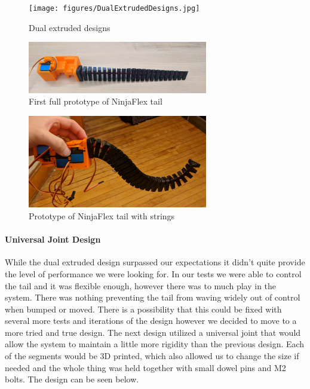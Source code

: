          \begin{figure}[H]
                \centering
                \texttt{[image: figures/DualExtrudedDesigns.jpg]}
                \caption{Dual extruded designs}
                \label{fig:DualExtrudedDesigns}
        \end{figure}
            
         \begin{figure}[H]
                \centering
                \includegraphics[width=0.7\textwidth]{figures/NinjaFlexTail.jpg}
                \caption{First full prototype of NinjaFlex tail}
                \label{fig:FirstPrototype}
        \end{figure}    
        
         \begin{figure}[H]
                \centering
                \includegraphics[width=0.7\textwidth]{figures/FirstPrototype1.jpg}
                \caption{Prototype of NinjaFlex tail with strings}
                \label{fig:FirstPrototypewithstrings}
        \end{figure} 
            
         \paragraph{Universal Joint Design} While the dual extruded design surpassed our expectations it didn't quite provide the level of performance we were looking for. In our tests we were able to control the tail and it was flexible enough, however there was to much play in the system. There was nothing preventing the tail from waving widely out of control when bumped or moved. There is a possibility that this could be fixed with several more tests and iterations of the design however we decided to move to a more tried and true design. The next design utilized a universal joint that would allow the system to maintain a little more rigidity than the previous design. Each of the segments would be 3D printed, which also allowed us to change the size if needed and the whole thing was held together with small dowel pins and M2 bolts. The design can be seen below.    
           
